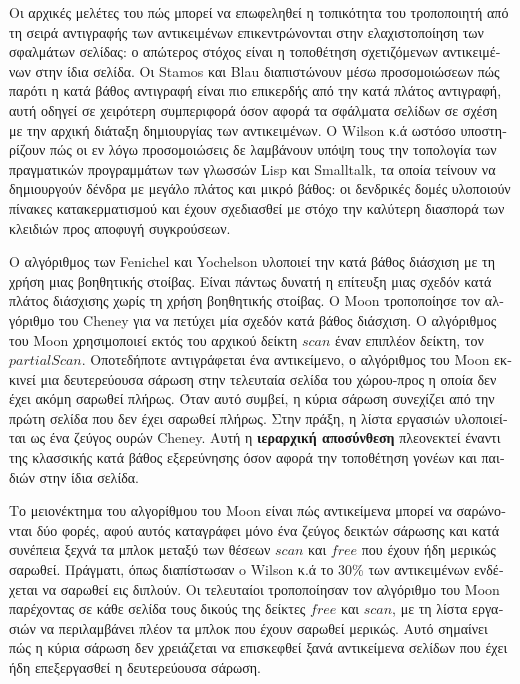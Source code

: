 \begin{greek}
Οι αρχικές μελέτες του πώς μπορεί να επωφεληθεί η τοπικότητα
του τροποποιητή από τη σειρά αντιγραφής των αντικειμένων επικεντρώνονται
στην ελαχιστοποίηση των σφαλμάτων σελίδας: ο απώτερος στόχος 
είναι η τοποθέτηση σχετιζόμενων αντικειμένων στην ίδια σελίδα.
Οι Stamos \cite{stamos1982large, DBLP:journals/tocs/Stamos84}
και Blau \cite{DBLP:journals/pe/Blau83} διαπιστώνουν μέσω προσομοιώσεων
πώς παρότι η κατά βάθος αντιγραφή είναι πιο επικερδής από την
κατά πλάτος αντιγραφή, αυτή οδηγεί σε χειρότερη συμπεριφορά όσον
αφορά τα σφάλματα σελίδων σε σχέση με την αρχική διάταξη δημιουργίας
των αντικειμένων. Ο Wilson κ.ά \cite{DBLP:conf/pldi/WilsonLM91}
ωστόσο υποστηρίζουν πώς οι εν λόγω προσομοιώσεις δε λαμβάνουν
υπόψη τους την τοπολογία των πραγματικών προγραμμάτων των γλωσσών
Lisp και Smalltalk, τα οποία τείνουν να δημιουργούν δένδρα με
μεγάλο πλάτος και μικρό βάθος: οι δενδρικές δομές υλοποιούν
πίνακες κατακερματισμού και έχουν σχεδιασθεί με στόχο την καλύτερη
διασπορά των κλειδιών προς αποφυγή συγκρούσεων.

Ο αλγόριθμος των Fenichel και Yochelson υλοποιεί την κατά βάθος
διάσχιση με τη χρήση μιας βοηθητικής στοίβας. Είναι πάντως δυνατή
η επίτευξη μιας σχεδόν κατά πλάτος διάσχισης χωρίς τη χρήση
βοηθητικής στοίβας. Ο Moon \cite{DBLP:conf/lfp/Moon84} τροποποίησε
τον αλγόριθμο του Cheney για να πετύχει μία σχεδόν κατά βάθος
διάσχιση. Ο αλγόριθμος του Moon χρησιμοποιεί εκτός του αρχικού
δείκτη $scan$ έναν επιπλέον δείκτη, τον $partialScan$. Οποτεδήποτε
αντιγράφεται ένα αντικείμενο, ο αλγόριθμος του Moon εκκινεί μια
δευτερεύουσα σάρωση στην τελευταία σελίδα του χώρου-προς η οποία
δεν έχει ακόμη σαρωθεί πλήρως. Όταν αυτό συμβεί, η κύρια σάρωση
συνεχίζει από την πρώτη σελίδα που δεν έχει σαρωθεί πλήρως. Στην
πράξη, η λίστα εργασιών υλοποιείται ως ένα ζεύγος ουρών Cheney.
Αυτή η \textbf{ιεραρχική αποσύνθεση} πλεονεκτεί έναντι της κλασσικής
κατά βάθος εξερεύνησης όσον αφορά την τοποθέτηση γονέων και
παιδιών στην ίδια σελίδα.

Το μειονέκτημα του αλγορίθμου του Moon είναι πώς αντικείμενα
μπορεί να σαρώνονται δύο φορές, αφού αυτός καταγράφει μόνο ένα
ζεύγος δεικτών σάρωσης και κατά συνέπεια ξεχνά τα μπλοκ μεταξύ
των θέσεων $scan$ και $free$ που έχουν ήδη μερικώς σαρωθεί.
Πράγματι, όπως διαπίστωσαν o Wilson κ.ά \cite{DBLP:conf/pldi/WilsonLM91}
το 30\% των αντικειμένων ενδέχεται να σαρωθεί εις διπλούν. Οι
τελευταίοι τροποποίησαν τον αλγόριθμο του Moon παρέχοντας σε
κάθε σελίδα τους δικούς της δείκτες $free$ και $scan$, με τη
λίστα εργασιών να περιλαμβάνει πλέον τα μπλοκ που έχουν σαρωθεί
μερικώς. Αυτό σημαίνει πώς η κύρια σάρωση δεν χρειάζεται να
επισκεφθεί ξανά αντικείμενα σελίδων που έχει ήδη επεξεργασθεί
η δευτερεύουσα σάρωση.


\end{greek}
